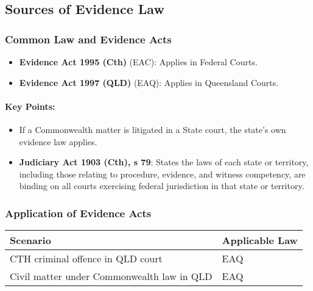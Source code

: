 \subsection{Sources of Evidence Law}\label{sources-of-evidence-law}

\subsubsection{Common Law and Evidence
Acts}\label{common-law-and-evidence-acts}

\begin{itemize}
\tightlist
\item
  \textbf{Evidence Act 1995 (Cth)} (EAC): Applies in Federal Courts.
\item
  \textbf{Evidence Act 1997 (QLD)} (EAQ): Applies in Queensland Courts.
\end{itemize}

\paragraph{Key Points:}\label{key-points}

\begin{itemize}
\tightlist
\item
  If a Commonwealth matter is litigated in a State court, the state's
  own evidence law applies.
\item
  \textbf{Judiciary Act 1903 (Cth), s 79}: States the laws of each state
  or territory, including those relating to procedure, evidence, and
  witness competency, are binding on all courts exercising federal
  jurisdiction in that state or territory.
\end{itemize}

\subsubsection{Application of Evidence
Acts}\label{application-of-evidence-acts}

\begin{longtable}[]{@{}
  >{\raggedright\arraybackslash}p{}
  >{\raggedright\arraybackslash}p{}@{}}
\toprule\noalign{}
\begin{minipage}[b]{\linewidth}\raggedright
Scenario
\end{minipage} & \begin{minipage}[b]{\linewidth}\raggedright
Applicable Law
\end{minipage} \\
\midrule\noalign{}
\endhead
\bottomrule\noalign{}
\endlastfoot
CTH criminal offence in QLD court & EAQ \\
Civil matter under Commonwealth law in QLD & EAQ \\
\end{longtable}

